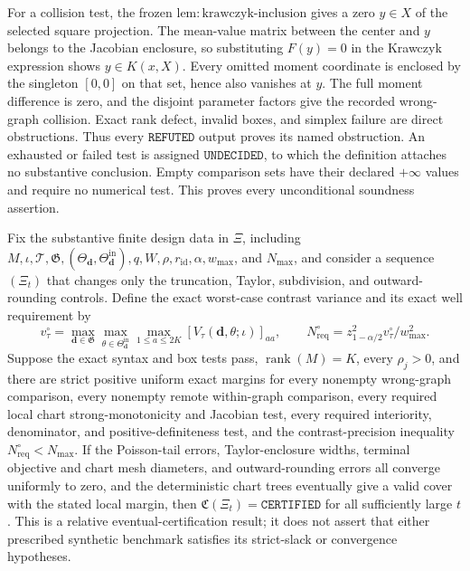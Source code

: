 For a collision test, the frozen \(\mathrm{lem{:}krawczyk\text{-}inclusion}\) gives a zero \(y\in X\) of the selected square projection.  The mean-value matrix between the center and \(y\) belongs to the Jacobian enclosure, so substituting \(F(y)=0\) in the Krawczyk expression shows \(y\in K(x,X)\).  Every omitted moment coordinate is enclosed by the singleton \([0,0]\) on that set, hence also vanishes at \(y\).  The full moment difference is zero, and the disjoint parameter factors give the recorded wrong-graph collision.  Exact rank defect, invalid boxes, and simplex failure are direct obstructions.  Thus every \(\mathtt{REFUTED}\) output proves its named obstruction.  An exhausted or failed test is assigned \(\mathtt{UNDECIDED}\), to which the definition attaches no substantive conclusion.  Empty comparison sets have their declared \(+\infty\) values and require no numerical test.  This proves every unconditional soundness assertion.

Fix the substantive finite design data in \(\Xi\), including \(M,\iota,\mathcal T,\mathfrak G,(\Theta_{\boldsymbol d},\Theta^{\mathrm{in}}_{\boldsymbol d}),q,W,\rho,r_{\mathrm{id}},\alpha,w_{\max}\), and \(N_{\max}\), and consider a sequence \((\Xi_t)\) that changes only the truncation, Taylor, subdivision, and outward-rounding controls.  Define the exact worst-case contrast variance and its exact well requirement by
\[
 v_\tau^\circ=\max_{\boldsymbol d\in\mathfrak G}
 \max_{\theta\in\Theta^{\mathrm{in}}_{\boldsymbol d}}
 \max_{1\leq a\leq2K}
 [V_\tau(\boldsymbol d,\theta;\iota)]_{aa},
 \qquad
 N_{\mathrm{req}}^\circ=
 z_{1-\alpha/2}^2v_\tau^\circ/w_{\max}^2.
\]
Suppose the exact syntax and box tests pass, \(\operatorname{rank}(M)=K\), every \(\rho_j>0\), and there are strict positive uniform exact margins for every nonempty wrong-graph comparison, every nonempty remote within-graph comparison, every required local chart strong-monotonicity and Jacobian test, every required interiority, denominator, and positive-definiteness test, and the contrast-precision inequality \(N_{\mathrm{req}}^\circ<N_{\max}\).  If the Poisson-tail errors, Taylor-enclosure widths, terminal objective and chart mesh diameters, and outward-rounding errors all converge uniformly to zero, and the deterministic chart trees eventually give a valid cover with the stated local margin, then \(\mathfrak C(\Xi_t)=\mathtt{CERTIFIED}\) for all sufficiently large \(t\).  This is a relative eventual-certification result; it does not assert that either prescribed synthetic benchmark satisfies its strict-slack or convergence hypotheses.

